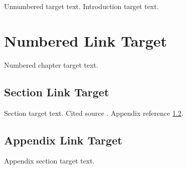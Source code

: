 \documentclass[a4paper,12pt]{report}
\begin{document}
\tableofcontents
\clearpage
{}
Unnumbered target text.
\clearpage
\introChapter
Introduction target text.
\clearpage
\chapter{Numbered Link Target}
Numbered chapter target text.
\section{Section Link Target}
Section target text.
\clearpage
Cited source \cite{png_spec}.
Appendix reference \ref{appendix:toc-link}.
\bibliographyChapter
\appendixChapter
\section{Appendix Link Target}\label{appendix:toc-link}
Appendix section target text.
\end{document}
